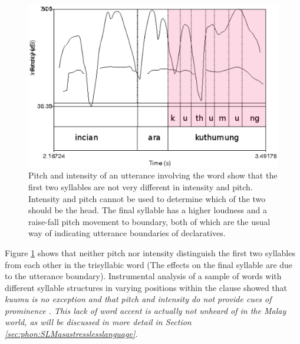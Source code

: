 \begin{figure}
 \centering
\includegraphics{pics/kuthumungintenspitch.eps}
 \caption[Absence of pitch and intensity cues for stress in the word ]{Pitch and intensity of an utterance involving the word  show that the first two syllables are not very different in intensity and pitch. Intensity and pitch cannot be used to determine which of the two should be the head. The final syllable has a higher loudness and a raise-fall pitch movement to boundary, both of which are the usual way of indicating utterance boundaries of declaratives.}
\label{fig:kuthumungintenspitch}
\end{figure}



Figure \ref{fig:kuthumungintenspitch} shows that neither pitch nor intensity distinguish the first two syllables from each other in the trisyllabic word (The effects on the final syllable are due to the utterance boundary). Instrumental analysis of a sample of words with different syllable structures in varying positions within the clause showed that \em ku\dentt umu\ng{} \em is no exception and that pitch and intensity do not provide cues of prominence \citep{ApoussidouEtAl2008}. This lack of word accent is actually not unheard of in the Malay world, as will be discussed in more detail in Section \ref{sec:phon:SLMasastresslesslanguage}.


